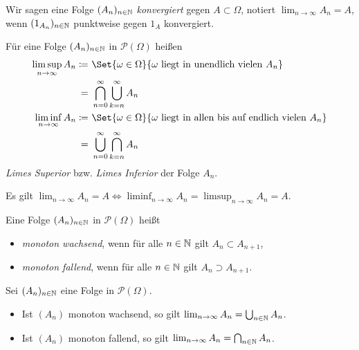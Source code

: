 \documentclass{cheat-sheet}
\newcommand{\PS}{\mathcal{P}} %
\newcommand{\PSO}{\PS(\Omega)} %
\begin{document}
\begin{defn}
  Wir sagen eine Folge $(A_n)_{n \in \mathbb{N}}$ \emph{konvergiert} gegen $A \subset \Omega$, notiert $\lim_{n \to \infty} A_n = A$, wenn $(1_{A_n})_{n \in \mathbb{N}}$ punktweise gegen $1_A$ konvergiert.
\end{defn}

\begin{defn}
  Für eine Folge $(A_n)_{n \in \mathbb{N}}$ in $\PS(\Omega)$ heißen
  \begin{align*}
    \limsup_{n \to \infty} A_n \coloneqq&~\Set{ \omega \in \Omega }{ \omega \text{ liegt in unendlich vielen } A_n } \\
    =&~\bigcap_{n = 0}^\infty \bigcup_{k = n}^\infty A_n \\
    \liminf_{n \to \infty} A_n \coloneqq&~\Set{ \omega \in \Omega }{ \omega \text{ liegt in allen bis auf endlich vielen } A_n } \\
    =&~\bigcup_{n = 0}^\infty \bigcap_{k = n}^\infty A_n
  \end{align*}
  \emph{Limes Superior} bzw. \emph{Limes Inferior} der Folge $A_n$.
\end{defn}


\begin{satz}
  Es gilt $\lim_{n \to \infty} A_n = A \iff \liminf_{n \to \infty} A_n = \limsup_{n \to \infty} A_n = A$.
\end{satz}

\begin{defn}
  Eine Folge $(A_n)_{n \in \mathbb{N}}$ in $\PSO$ heißt
  \begin{itemize}
    \item \emph{monoton wachsend}, wenn für alle $n \in \mathbb{N}$ gilt $A_n \subset A_{n+1}$,
    \item \emph{monoton fallend}, wenn für alle $n \in \mathbb{N}$ gilt $A_n \supset A_{n+1}$.
  \end{itemize}
\end{defn}

\begin{satz}
  Sei $(A_n)_{n \in \mathbb{N}}$ eine Folge in $\PSO$.
  \begin{itemize}
    \item Ist $(A_n)$ monoton wachsend, so gilt $\lim_{n \to \infty} A_n = \bigcup_{n \in \mathbb{N}} A_n$.
    \item Ist $(A_n)$ monoton fallend, so gilt $\lim_{n \to \infty} A_n = \bigcap_{n \in \mathbb{N}} A_n$.
  \end{itemize}
\end{satz}
\end{document}
